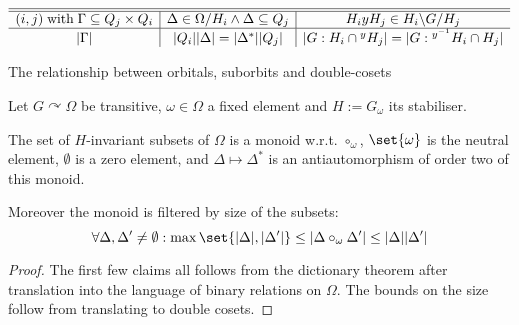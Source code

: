 \documentclass[fontsize=11pt,fleqn,a4paper]{scrartcl}
\begin{document}
\begin{landscape}
\begin{table}[htp]
\[\begin{array}{ c | c | c}
\hline
\hline

(i,j)\;\text{with}\;\Gamma\subseteq Q_j\times Q_i & \Delta\in\Omega/H_i \wedge \Delta\subseteq Q_j & H_i y H_j \in H_i\backslash G /H_j \\

\hline

\lvert\Gamma\rvert & \lvert Q_i\rvert\lvert\Delta\rvert=\lvert\Delta^\ast\rvert\lvert Q_j\rvert & \lvert G: H_i \cap {^y H_j}\rvert=\lvert G: {^{y^{-1}}H_i}\cap H_j\rvert

\end{array}\]

\caption{The relationship between orbitals, suborbits and double-cosets}
\label{dictionary:table_for_minimal_elements}

\end{table}

\end{landscape}


\begin{lemma}
Let $G \curvearrowright \Omega$ be transitive, $\omega\in\Omega$ a fixed element and $H:=G_\omega$ its stabiliser.

The set of $H$-invariant subsets of $\Omega$ is a monoid w.r.t. $\circ_\omega$, $\set{\omega}$ is the neutral element, $\emptyset$ is a zero element, and $\Delta\mapsto\Delta^\ast$ is an antiautomorphism of order two of this monoid.

Moreover the monoid is filtered by size of the subsets:
\[\forall\Delta,\Delta'\neq\emptyset: \max\set{\abs{\Delta},\abs{\Delta'}}\leq\abs{\Delta\circ_\omega\Delta'} \leq \abs{\Delta}\abs{\Delta'}\]
\end{lemma}
\begin{proof}
The first few claims all follows from the dictionary theorem after translation into the language of binary relations on $\Omega$. The bounds on the size follow from translating to double cosets.
\end{proof}
\end{document}
